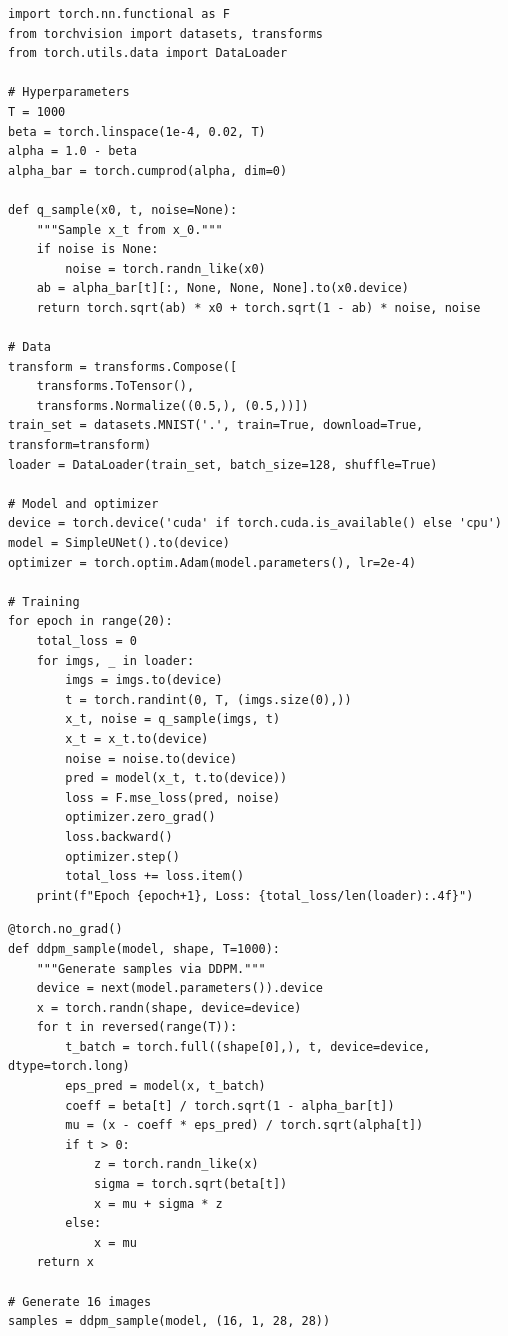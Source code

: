\begin{codeblock}[title=\textbf{DDPM Training Loop}]
\begin{verbatim}
import torch.nn.functional as F
from torchvision import datasets, transforms
from torch.utils.data import DataLoader

# Hyperparameters
T = 1000
beta = torch.linspace(1e-4, 0.02, T)
alpha = 1.0 - beta
alpha_bar = torch.cumprod(alpha, dim=0)

def q_sample(x0, t, noise=None):
    """Sample x_t from x_0."""
    if noise is None:
        noise = torch.randn_like(x0)
    ab = alpha_bar[t][:, None, None, None].to(x0.device)
    return torch.sqrt(ab) * x0 + torch.sqrt(1 - ab) * noise, noise

# Data
transform = transforms.Compose([
    transforms.ToTensor(),
    transforms.Normalize((0.5,), (0.5,))])
train_set = datasets.MNIST('.', train=True, download=True, transform=transform)
loader = DataLoader(train_set, batch_size=128, shuffle=True)

# Model and optimizer
device = torch.device('cuda' if torch.cuda.is_available() else 'cpu')
model = SimpleUNet().to(device)
optimizer = torch.optim.Adam(model.parameters(), lr=2e-4)

# Training
for epoch in range(20):
    total_loss = 0
    for imgs, _ in loader:
        imgs = imgs.to(device)
        t = torch.randint(0, T, (imgs.size(0),))
        x_t, noise = q_sample(imgs, t)
        x_t = x_t.to(device)
        noise = noise.to(device)
        pred = model(x_t, t.to(device))
        loss = F.mse_loss(pred, noise)
        optimizer.zero_grad()
        loss.backward()
        optimizer.step()
        total_loss += loss.item()
    print(f"Epoch {epoch+1}, Loss: {total_loss/len(loader):.4f}")
\end{verbatim}
\end{codeblock}

\begin{codeblock}[title=\textbf{DDPM Sampling Loop}]
\begin{verbatim}
@torch.no_grad()
def ddpm_sample(model, shape, T=1000):
    """Generate samples via DDPM."""
    device = next(model.parameters()).device
    x = torch.randn(shape, device=device)
    for t in reversed(range(T)):
        t_batch = torch.full((shape[0],), t, device=device, dtype=torch.long)
        eps_pred = model(x, t_batch)
        coeff = beta[t] / torch.sqrt(1 - alpha_bar[t])
        mu = (x - coeff * eps_pred) / torch.sqrt(alpha[t])
        if t > 0:
            z = torch.randn_like(x)
            sigma = torch.sqrt(beta[t])
            x = mu + sigma * z
        else:
            x = mu
    return x

# Generate 16 images
samples = ddpm_sample(model, (16, 1, 28, 28))
\end{verbatim}
\end{codeblock}


